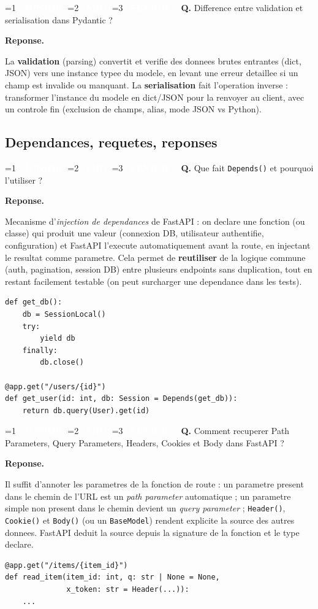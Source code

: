 \documentclass[11pt,a4paper]{article}
\newcommand{\badgeJ}{\textcolor{white}{\colorbox{junior}{\small\bfseries\ JUNIOR\ }}}
\newcommand{\badgeM}{\textcolor{white}{\colorbox{mid}{\small\bfseries\ MID\ }}}
\newcommand{\badgeS}{\textcolor{white}{\colorbox{senior}{\small\bfseries\ SENIOR\ }}}
\newcounter{qcount}
\newenvironment{qa}[2]{%
  \stepcounter{qcount}%
  \par\vspace{6pt}%
  \noindent\colorbox{qbg}{\parbox{\dimexpr\linewidth-12pt}{\vspace{2pt}%
  \ifnum#1=1 \badgeJ\fi\ifnum#1=2 \badgeM\fi\ifnum#1=3 \badgeS\fi
  \ \textbf{Q\theqcount.} #2\vspace{2pt}}}\par\vspace{4pt}%
  \noindent\textbf{\color{accent}Reponse.}\ \ignorespaces
}{%
  \par\vspace{8pt}%
}
\begin{document}
\begin{qa}{2}{Difference entre validation et serialisation dans Pydantic ?}
La \textbf{validation} (parsing) convertit et verifie des donnees brutes
entrantes (dict, JSON) vers une instance typee du modele, en levant une erreur
detaillee si un champ est invalide ou manquant. La \textbf{serialisation} fait
l'operation inverse : transformer l'instance du modele en dict/JSON pour la
renvoyer au client, avec un controle fin (exclusion de champs, alias, mode
JSON vs Python).
\end{qa}

\subsection{Dependances, requetes, reponses}

\begin{qa}{1}{Que fait \texttt{Depends()} et pourquoi l'utiliser ?}
Mecanisme d'\emph{injection de dependances} de FastAPI : on declare une
fonction (ou classe) qui produit une valeur (connexion DB, utilisateur
authentifie, configuration) et FastAPI l'execute automatiquement avant la
route, en injectant le resultat comme parametre. Cela permet de
\textbf{reutiliser} de la logique commune (auth, pagination, session DB) entre
plusieurs endpoints sans duplication, tout en restant facilement testable
(on peut surcharger une dependance dans les tests).
\begin{lstlisting}
def get_db():
    db = SessionLocal()
    try:
        yield db
    finally:
        db.close()

@app.get("/users/{id}")
def get_user(id: int, db: Session = Depends(get_db)):
    return db.query(User).get(id)
\end{lstlisting}
\end{qa}

\begin{qa}{1}{Comment recuperer Path Parameters, Query Parameters, Headers, Cookies et Body dans FastAPI ?}
Il suffit d'annoter les parametres de la fonction de route : un parametre
present dans le chemin de l'URL est un \emph{path parameter} automatique ; un
parametre simple non present dans le chemin devient un \emph{query
parameter} ; \texttt{Header()}, \texttt{Cookie()} et \texttt{Body()} (ou un
\texttt{BaseModel}) rendent explicite la source des autres donnees. FastAPI
deduit la source depuis la signature de la fonction et le type declare.
\begin{lstlisting}
@app.get("/items/{item_id}")
def read_item(item_id: int, q: str | None = None,
              x_token: str = Header(...)):
    ...
\end{lstlisting}
\end{qa}
\end{document}
